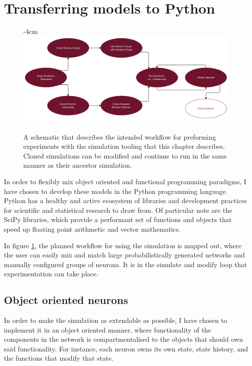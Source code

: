 
\section{Transferring models to Python}

\begin{figure}[h]
    \centering
    \addtolength{\leftskip} {-4cm}
    \addtolength{\rightskip}{-4cm}
    \includegraphics[width=1.3\linewidth]{figures/images/workflow.png}
    \caption[Workflow of the project simulation tooling]{A schematic that describes the intended workflow for preforming experiments with the simulation tooling that this chapter describes. Cloned simulations can be modified and continue to run in the same manner as their ancestor simulation.}
    \label{fig:workflow}
\end{figure}

In order to flexibly mix object oriented and functional programming paradigms,
I have chosen to develop these models in the Python programming language. Python has a healthy and active ecosystem of libraries and development practices
for scientific and statistical research to draw from. Of particular note are the
SciPy libraries, which provide a performant set of functions and objects that
speed up floating point arithmetic and vector mathematics. 

In figure \ref{fig:workflow}, the planned workflow for using the simulation is
mapped out, where the user can easily mix and match large probabilistically
generated networks and manually configured groups of neurons. It is in the
simulate and modify loop that experimentation can take place.

\subsection{Object oriented neurons}

In order to make the simulation as extendable as possible, I have chosen to
implement it in an object oriented manner, where functionality of the components
in the network is compartmentalised to the objects that should own said
functionality. For instance, each neuron owns its own state, state history, and
the functions that modify that state.

